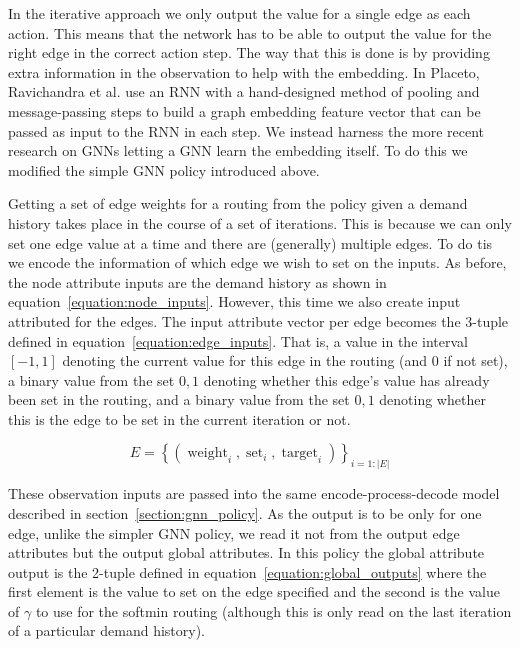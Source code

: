 In the iterative approach we only output the value for a single edge as each action. This means that the network has to be able to output the value for the right edge in the correct action step. The way that this is done is by providing extra information in the observation to help with the embedding. In Placeto, Ravichandra et al. use an RNN with a hand-designed method of pooling and message-passing steps to build a graph embedding feature vector that can be passed as input to the RNN in each step. We instead harness the more recent research on GNNs letting a GNN learn the embedding itself. To do this we modified the simple GNN policy introduced above.

Getting a set of edge weights for a routing from the policy given a demand history takes place in the course of a set of iterations. This is because we can only set one edge value at a time and there are (generally) multiple edges. To do tis we encode the information of which edge we wish to set on the inputs. As before, the node attribute inputs are the demand history as shown in equation~\ref{equation:node_inputs}. However, this time we also create input attributed for the edges. The input attribute vector per edge becomes the 3-tuple defined in equation~\ref{equation:edge_inputs}. That is, a value in the interval $[-1,1]$ denoting the current value for this edge in the routing (and 0 if not set), a binary value from the set ${0,1}$ denoting whether this edge's value has already been set in the routing, and a binary value from the set ${0,1}$ denoting whether this is the edge to be set in the current iteration or not.

\begin{equation}
  \label{equation:edge_inputs}
  E = \left\{ (\operatorname{weight}_i, \operatorname{set}_i, \operatorname{target}_i) \right\}_{i=1:|E|}
\end{equation}

These observation inputs are passed into the same encode-process-decode model described in section~\ref{section:gnn_policy}. As the output is to be only for one edge, unlike the simpler GNN policy, we read it not from the output edge attributes but the output global attributes. In this policy the global attribute output is the 2-tuple defined in equation~\ref{equation:global_outputs} where the first element is the value to set on the edge specified and the second is the value of $\gamma$ to use for the softmin routing (although this is only read on the last iteration of a particular demand history).

